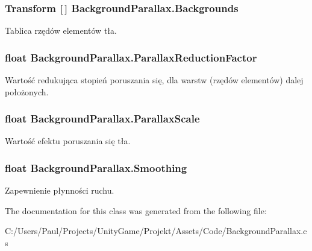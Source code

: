 \subsubsection[{Backgrounds}]{\setlength{\rightskip}{0pt plus 5cm}Transform \mbox{[}$\,$\mbox{]} Background\+Parallax.\+Backgrounds}\label{class_background_parallax_a626641e92b9bedfbd0f5aaf2938875b3}


Tablica rzędów elementów tła. 

\hypertarget{class_background_parallax_aad6f6a27f24a5d911991227f8abe1a71}{}
\subsubsection[{Parallax\+Reduction\+Factor}]{\setlength{\rightskip}{0pt plus 5cm}float Background\+Parallax.\+Parallax\+Reduction\+Factor}\label{class_background_parallax_aad6f6a27f24a5d911991227f8abe1a71}


Wartość redukująca stopień poruszania się, dla warstw (rzędów elementów) dalej położonych. 

\hypertarget{class_background_parallax_a078a366dfc612de0f0848b9be330f055}{}
\subsubsection[{Parallax\+Scale}]{\setlength{\rightskip}{0pt plus 5cm}float Background\+Parallax.\+Parallax\+Scale}\label{class_background_parallax_a078a366dfc612de0f0848b9be330f055}


Wartość efektu poruszania się tła. 

\hypertarget{class_background_parallax_ad9e09d728695d0c26f103ee614b67000}{}
\subsubsection[{Smoothing}]{\setlength{\rightskip}{0pt plus 5cm}float Background\+Parallax.\+Smoothing}\label{class_background_parallax_ad9e09d728695d0c26f103ee614b67000}


Zapewnienie płynności ruchu. 



The documentation for this class was generated from the following file\+:\begin{DoxyCompactItemize}
\item 
C\+:/\+Users/\+Paul/\+Projects/\+Unity\+Game/\+Projekt/\+Assets/\+Code/Background\+Parallax.\+cs\end{DoxyCompactItemize}
